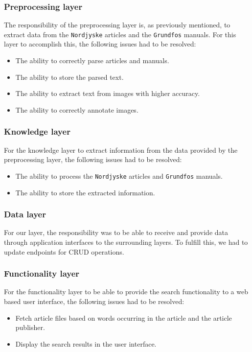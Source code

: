 \subsubsection*{Preprocessing layer}
The responsibility of the preprocessing layer is, as previously mentioned, to extract data from the \texttt{Nordjyske} articles and the \texttt{Grundfos} manuals. For this layer to accomplish this, the following issues had to be resolved:
\begin{itemize}
    \item The ability to correctly parse articles and manuals.
    \item The ability to store the parsed text.
    \item The ability to extract text from images with higher accuracy.
    \item The ability to correctly annotate images.
\end{itemize}

\subsubsection*{Knowledge layer}
For the knowledge layer to extract information from the data provided by the preprocessing layer, the following issues had to be resolved:
\begin{itemize}
    \item The ability to process the \texttt{Nordjyske} articles and \texttt{Grundfos} manuals.
    \item The ability to store the extracted information.
\end{itemize}

\subsubsection*{Data layer}
For our layer, the responsibility was to be able to receive and provide data through application interfaces to the surrounding layers.
To fulfill this, we had to update endpoints for CRUD operations.

\subsubsection*{Functionality layer}
For the functionality layer to be able to provide the search functionality to a web based user interface, the following issues had to be resolved:
\begin{itemize}
    \item Fetch article files based on words occurring in the article and the article publisher.
    \item Display the search results in the user interface.
\end{itemize}
